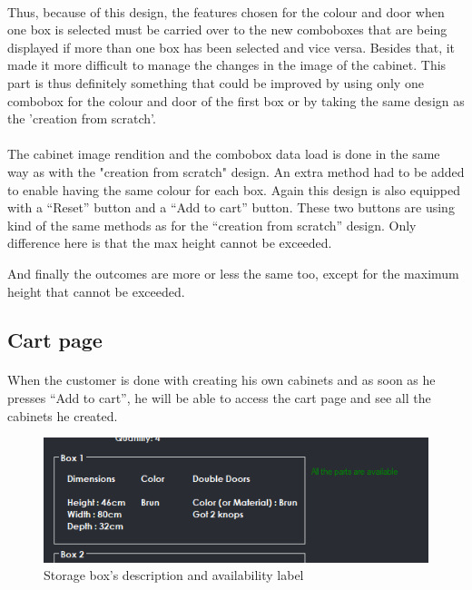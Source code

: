 \documentclass[12pt,oneside]{report}
\begin{document}
            \paragraph{}
            Thus, because of this design, the features chosen for the colour and door when one box is selected must be carried over to the new comboboxes that are being displayed if more than one box has been selected and vice versa. Besides that, it made it more difficult to manage the changes in the image of the cabinet. This part is thus definitely something that could be improved by using only one combobox for the colour and door of the first box or by taking the same design as the 'creation from scratch'.
            
            \paragraph{}
            The cabinet image rendition and the combobox data load is done in the same way as with the "creation from scratch" design. An extra method had to be added to enable having the same colour for each box. Again this design is also equipped with a “Reset” button and a “Add to cart” button. These two buttons are using kind of the same methods as for the “creation from scratch” design. Only difference here is that the max height cannot be exceeded. 
            
            And finally the outcomes are more or less the same too, except for the maximum height that cannot be exceeded.
           
    \newpage
    \subsection{Cart page}
        \paragraph{}
        When the customer is done with creating his own cabinets and as soon as he presses “Add to cart”, he will be able to access the cart page and see all the cabinets he created.
        \vspace{\baselineskip}
        
        \begin{figure}[h!]
            \centering
    		\includegraphics[scale=0.7]{Figures/AvailableLabel.PNG}
    		\caption{Storage box's description and availability label}
    		\label{avail}
    	\end{figure}
    	
\end{document}
